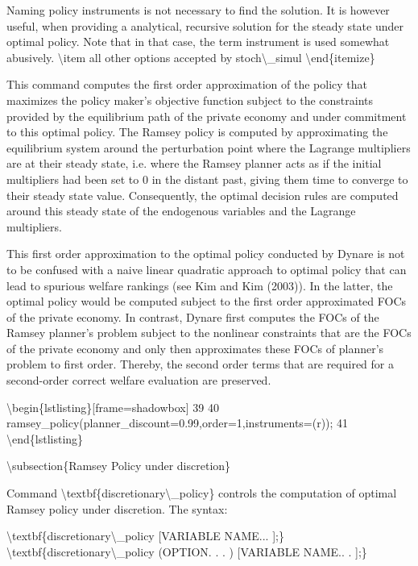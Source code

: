 \documentclass[10pt,math=newtx,citestyle=gb7714-2015,bibstyle=gb7714-2015]{elegantbook}
\begin{document}
	Naming policy instruments is not necessary to find the solution. It is however useful, when providing a analytical, recursive solution for the steady state under optimal policy. Note that in that case, the term instrument is used somewhat abusively.
	\textbackslash{}item all other options accepted by stoch\textbackslash{}\_simul
	\textbackslash{}end\{itemize\}
	
	This command computes the first order approximation of the policy that maximizes the policy maker’s objective function subject to the constraints provided by the equilibrium path of the private economy and under commitment to this optimal policy. The Ramsey policy is computed by approximating the equilibrium system around the perturbation point where the Lagrange multipliers are at their steady state, i.e. where the Ramsey planner acts as if the initial multipliers had been set to 0 in the distant past, giving them time to converge to their steady state value. Consequently, the optimal decision rules are computed around this steady state of the endogenous variables and the Lagrange multipliers.
	
	This first order approximation to the optimal policy conducted by Dynare is not to be confused with a naive linear quadratic approach to optimal policy that can lead to spurious welfare rankings (see Kim and Kim (2003)). In the latter, the optimal policy would be computed subject to the first order approximated FOCs of the private economy. In contrast, Dynare first computes the FOCs of the Ramsey planner’s problem subject to the nonlinear constraints that are the FOCs of the private economy and only then approximates these FOCs of planner’s problem to first order. Thereby, the second order terms that are required for a second-order correct welfare evaluation are preserved.
	
	\textbackslash{}begin\{lstlisting\}[frame=shadowbox]
	39
	40 ramsey\_policy(planner\_discount=0.99,order=1,instruments=(r));
	41
	\textbackslash{}end\{lstlisting\}
	
	\textbackslash{}subsection\{Ramsey Policy under discretion\}
	
	Command \textbackslash{}textbf\{discretionary\textbackslash{}\_policy\} controls the computation of optimal Ramsey policy under discretion. The syntax:
	
	\textbackslash{}textbf\{discretionary\textbackslash{}\_policy [VARIABLE NAME... ];\}
	\textbackslash{}textbf\{discretionary\textbackslash{}\_policy (OPTION. . . ) [VARIABLE NAME.. . ];\}
	
\end{document}
